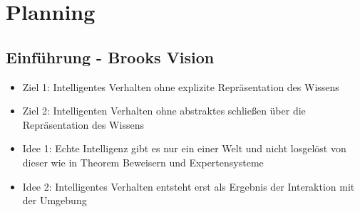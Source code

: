 \documentclass{article} %
\begin{document}
\section{Planning}
	\subsection{Einführung - Brooks Vision}
	\begin{itemize}
		\item Ziel 1: Intelligentes Verhalten ohne explizite Repräsentation des Wissens
		\item Ziel 2: Intelligenten Verhalten ohne abstraktes schließen über die Repräsentation des Wissens
		\item Idee 1: Echte Intelligenz gibt es nur ein einer Welt und nicht losgelöst von dieser wie in Theorem Beweisern und Expertensysteme
		\item Idee 2: Intelligentes Verhalten entsteht erst als Ergebnis der Interaktion mit der Umgebung
	\end{itemize}
\end{document}
